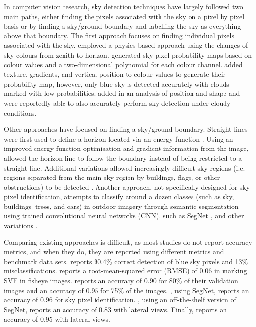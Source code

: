 \documentclass[final,3p,times,authoryear]{elsarticle}
\begin{document}
In computer vision research, sky detection techniques have largely followed two main paths, either finding the pixels associated with the sky on a pixel by pixel basis or by finding a sky/ground boundary and labelling the sky as everything above that boundary. The first approach focuses on finding individual pixels associated with the sky. \cite{Luo2002} employed a physics-based approach using the changes of sky colours from zenith to horizon. \cite{Gallagher2004} generated sky pixel probability maps based on colour values and a two-dimensional polynomial for each colour channel. \cite{Zafarifar2007} added texture, gradients, and vertical position to colour values to generate their probability map, however, only blue sky is detected accurately with clouds marked with low probabilities. \cite{Schmitt2009} added in an analysis of position and shape and were reportedly able to also accurately perform sky detection under cloudy conditions. 

Other approaches have focused on finding a sky/ground boundary. Straight lines were first used to define a horizon located via an energy function \citep{Ettinger2003}. Using an improved energy function optimisation and gradient information from the image, \cite{Shen2013} allowed the horizon line to follow the boundary instead of being restricted to a straight line. Additional variations allowed increasingly difficult sky regions (i.e. regions separated from the main sky region by buildings, flags, or other obstructions) to be detected \citep{Zhijie2014,Zhijie2015}. Another approach, not specifically designed for sky pixel identification, attempts to classify around a dozen classes (such as sky, buildings, trees, and cars) in outdoor imagery through semantic segmentation using trained convolutional neural networks (CNN), such as SegNet \citep{Badrinarayanan2017}, and other variations \citep{Holder2016,Middel2019}.



Comparing existing approaches is difficult, as most studies do not report accuracy metrics, and when they do, they are reported using different metrics and benchmark data sets. \cite{Luo2002} reports 90.4\% correct detection of blue sky pixels and 13\% misclassifications. \cite{Chapman2004} reports a root-mean-squared error (RMSE) of 0.06 in marking SVF in fisheye images. \cite{Schmitt2009} reports an accuracy of 0.90 for 80\% of their validation images and an accuracy of 0.95 for 75\% of the images. \cite{Liang2017}, using SegNet, reports an accuracy of 0.96 for sky pixel identification. \cite{Shen2018}, using an off-the-shelf version of SegNet, reports an accuracy of 0.83 with lateral views. Finally, \cite{Middel2019} reports an accuracy of 0.95 with lateral views.
\end{document}
